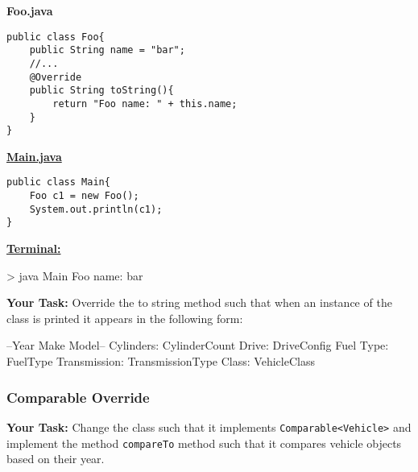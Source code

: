 \begin{framed}
\begin{minipage}{0.52\textwidth}
\textbf{Foo.java}
\begin{lstlisting}
public class Foo{
    public String name = "bar";
    //...
    @Override 
    public String toString(){
        return "Foo name: " + this.name;
    }
}
\end{lstlisting}
\end{minipage}
\hfill
\vline
\hfill
\begin{minipage}{0.42\textwidth}
\underline{\textbf{Main.java}}
\begin{lstlisting}
public class Main{
    Foo c1 = new Foo();
    System.out.println(c1);
}
\end{lstlisting}
\hline
\vspace{0.2cm}
\underline{\textbf{Terminal:}}
\begin{shell}
> java Main
Foo name: bar
\end{shell}
\end{minipage}
\end{framed}
\vspace{0.2cm}


\textbf{Your Task: } Override the to string method such that when an instance of the class is printed it appears in the following form:
\begin{shell}
--Year Make Model--
Cylinders: CylinderCount
Drive: DriveConfig
Fuel Type: FuelType 
Transmission: TransmissionType
Class: VehicleClass

\end{shell}

\subsubsection{Comparable Override}

\textbf{Your Task:} Change the class such that it implements \lstinline|Comparable<Vehicle>| and implement the method \lstinline|compareTo| method such that it compares vehicle objects based on their year.

